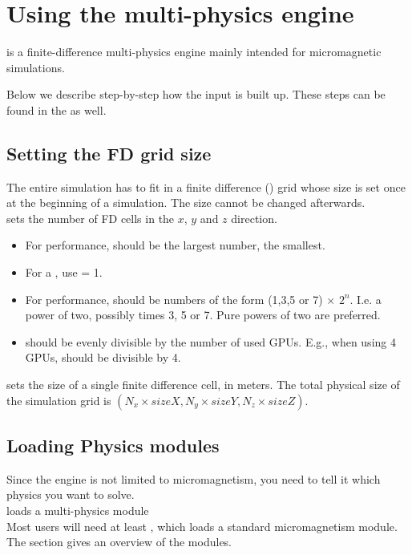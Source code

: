 \section{Using the multi-physics engine}

\mumax is a finite-difference multi-physics engine mainly intended for micromagnetic simulations.

Below we describe step-by-step how the input is built up. These steps can be found in the  as well.

\subsection{Setting the FD grid size}

The entire simulation has to fit in a finite difference () grid whose size is set once at the beginning of a simulation. The size cannot be changed afterwards.\\

 sets the number of FD cells in the $x$, $y$ and $z$ direction.
\begin{itemize} 
\item For performance,  should be the largest number,  the smallest. 
\item For a , use  = 1.\\
\item For performance,  should be numbers of the form (1,3,5 or 7) $\times$ $2^n$. I.e. a power of two, possibly times 3, 5 or 7. Pure powers of two are preferred.
\item {} should be evenly divisible by the number of used GPUs. E.g., when using 4 GPUs,  should be divisible by 4.
\end{itemize}

 sets the size of a single finite difference cell, in meters. The total physical size of the simulation grid is $(N_x \times sizeX, N_y \times sizeY, N_z \times sizeZ)$.


\subsection{Loading Physics modules}
Since the \mumax engine is not limited to micromagnetism, you need to tell it which physics you want to solve.\\

 loads a multi-physics module\\

Most users will need at least , which loads a standard micromagnetism module. The  section gives an overview of the modules.
